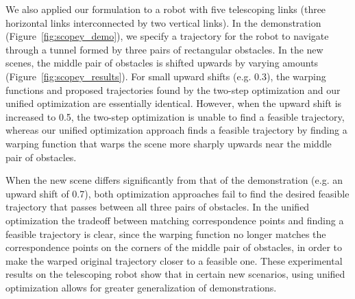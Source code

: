We also applied our formulation to a robot with five telescoping links (three horizontal links interconnected by two vertical links). In the demonstration (Figure~\ref{fig:scopey_demo}), we specify a trajectory for the robot to navigate through a tunnel formed by three pairs of rectangular obstacles. In the new scenes, the middle pair of obstacles is shifted upwards by varying amounts (Figure~\ref{fig:scopey_results}). For small upward shifts (e.g. 0.3), the warping functions and proposed trajectories found by the two-step optimization and our unified optimization are essentially identical. However, when the upward shift is increased to 0.5, the two-step optimization is unable to find a feasible trajectory, whereas our unified optimization approach finds a feasible trajectory by finding a warping function that warps the scene more sharply upwards near the middle pair of obstacles.

When the new scene differs significantly from that of the demonstration (e.g. an upward shift of 0.7), both optimization approaches fail to find the desired feasible trajectory that passes between all three pairs of obstacles. In the unified optimization the tradeoff between matching correspondence points and finding a feasible trajectory is clear, since the warping function no longer matches the correspondence points on the corners of the middle pair of obstacles, in order to make the warped original trajectory closer to a feasible one. These experimental results on the telescoping robot show that in certain new scenarios, using unified optimization allows for greater generalization of demonstrations.
